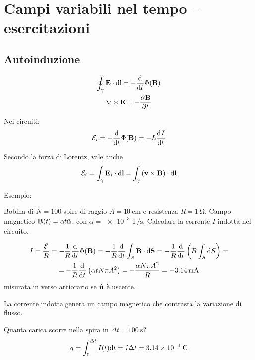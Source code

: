 \chapter{Campi variabili nel tempo -- esercitazioni}

\section{Autoinduzione}

\begin{subequations}
\begin{gather}
    \oint_\gamma \E \lde = - \der{t} \Phi(\B) \\
    \curl \E = - \parder[\B]{t}
\end{gather}
\end{subequations}

Nei circuiti:
\begin{equation}
    \fem_i = - \der{t} \Phi(\B) = - L \der[I]{t}
\end{equation}

Secondo la forza di Lorentz, vale anche
\begin{equation}
    \mathcal{E}_i = \int_\gamma \mathbf{E}_i \cdot \mathrm{d} \mathbf{l}
    = \int_\gamma \left( \mathbf{v} \times \mathbf{B} \right) \cdot \mathrm{d} \mathbf{l}
\end{equation}

Esempio:

Bobina di $N = 100$ spire di raggio $A = \qty{10}{\centi\metre}$ e resistenza $R = \qty{1}{\ohm}$.
Campo magnetico $\mathbf{B}(t) = \alpha t \hat{\mathbf{n}}$, con $\alpha = \qty{e-3}{\tesla\per\second}$.
Calcolare la corrente $I$ indotta nel circuito.

\begin{equation}
\begin{gathered}
    I = \frac{\fem}{R}
    = - \frac{1}{R} \der{t} \Phi(\B)
    = - \frac{1}{R} \der{t} \int_S \B \sde
    = - \frac{1}{R} \der{t}\pts{B \int_S \de S} = \\
    = - \frac{1}{R} \der{t}\pts{\alpha t N \pi A^2}
    = - \frac{\alpha N \pi A^2}{R}
    = -\qty{3.14}{\milli\ampere}
\end{gathered}
\end{equation}
misurata in verso antiorario se $\hat{\mathbf{n}}$ è uscente.

La corrente indotta genera un campo magnetico che contrasta la variazione di flusso.

Quanta carica scorre nella spira in $\Delta t = \qty{100}{\second}$?
\begin{equation}
    q = \int_{0}^{\Delta t} I(t) \mathrm{d} t = I \Delta t = \qty{3.14e-1}{\coulomb}
\end{equation}

